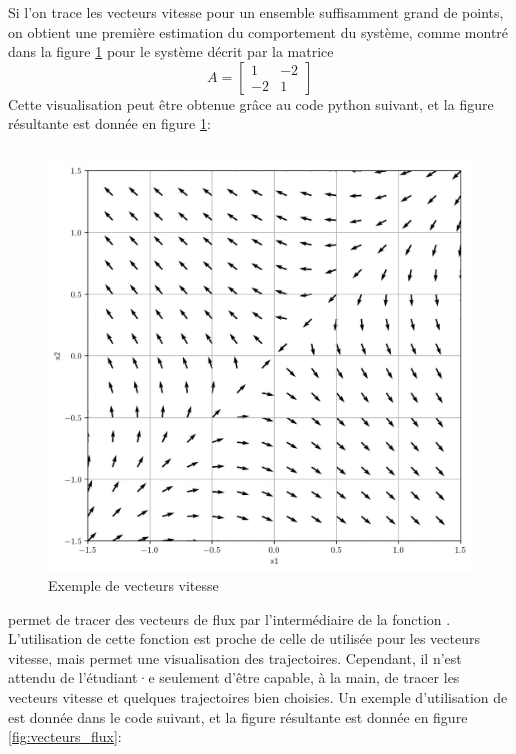         Si l'on trace les vecteurs vitesse pour un ensemble suffisamment grand de points, on obtient une première estimation du comportement du système, comme montré dans la figure \ref{fig:vecteurs_vitesse} pour le système décrit par la matrice 
        \begin{equation}
            A = \begin{bmatrix}1 & -2\\-2 & 1\end{bmatrix}
        \end{equation}
        Cette visualisation peut être obtenue grâce au code python suivant, et la figure résultante est donnée en figure \ref{fig:vecteurs_vitesse}:
        \inputminted{python}{codes/vecteurs_vitesse.py}
        
        \begin{figure}[ht!]
            \centering
            \includegraphics[width=\textwidth]{images/vecteurs_vitesse.jpg}
            \caption{Exemple de vecteurs vitesse}
            \label{fig:vecteurs_vitesse}
        \end{figure}

     permet de tracer des vecteurs de flux par l'intermédiaire de la fonction . L'utilisation de cette fonction est proche de celle de  utilisée pour les vecteurs vitesse, mais permet une visualisation des trajectoires. Cependant, il n'est attendu de l'étudiant·e seulement d'être capable, à la main, de tracer les vecteurs vitesse et quelques trajectoires bien choisies. Un exemple d'utilisation de  est donnée dans le code suivant, et la figure résultante est donnée en figure \ref{fig:vecteurs_flux}:
    \inputminted{python}{codes/vecteurs_flux.py}
        
